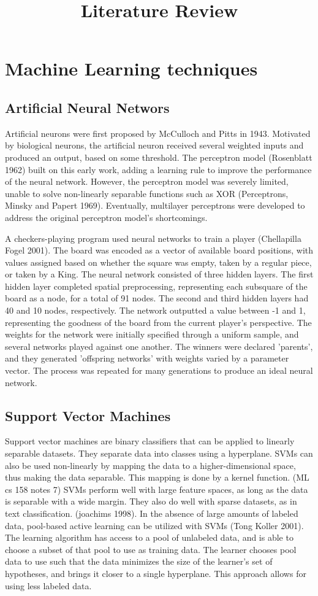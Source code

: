 \documentclass{article}
\title{Literature Review}
\begin{document}
\section{Machine Learning techniques}
\subsection{Artificial Neural Networs}
Artificial neurons were first proposed by McCulloch and Pitts in
1943. Motivated by biological neurons, the artificial neuron received
several weighted inputs and produced an output, based on some
threshold. The perceptron model (Rosenblatt 1962) built on this early
work, adding a learning rule to improve the performance of the neural
network. However, the perceptron model was severely limited, unable to
solve non-linearly separable functions such as XOR (Perceptrons, Minsky and
Papert 1969). Eventually, multilayer perceptrons were developed to
address the original perceptron model's shortcomings. 

A checkers-playing program used neural networks to train a player
(Chellapilla Fogel 2001). The board was encoded as a vector of
available board positions, with values assigned based on whether the
square was empty, taken by a regular piece, or taken by a King. The
neural network consisted of three hidden layers. The first hidden
layer completed
spatial preprocessing, representing each subsquare of the board as a
node, for a total of 91 nodes. The second and third hidden layers had
40 and 10 nodes, respectively. The network outputted a value between
-1 and 1, representing the goodness of the board from the current
player's perspective. The weights for the network were initially
specified through a uniform sample, and several networks played against one
another. The winners were declared 'parents', and they generated
'offspring networks' with weights varied by a parameter vector. The
process was repeated for many generations to produce an ideal neural
network.

\subsection{Support Vector Machines}
Support vector machines are binary classifiers that can be applied to linearly
separable datasets. They separate data into classes using a
hyperplane. SVMs can also be used non-linearly by mapping the data
to a higher-dimensional space, thus making the data separable. This
mapping is done by a kernel function. (ML cs 158 notes 7) SVMs perform well with large feature
spaces, as long as the data is separable with a wide margin. They also
do well with sparse datasets, as in text classification. (joachims
1998). 
In the absence of large amounts of labeled data, pool-based active
learning can be utilized with SVMs (Tong Koller 2001). The learning
algorithm has access to a pool of unlabeled data, and is able to
choose a subset of that pool to use as training data. The learner
chooses pool data to use such that the data minimizes the size of
the learner's set of hypotheses,
and brings it closer to a single hyperplane. This approach allows for
using less labeled data.
\end{document}
